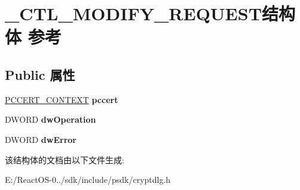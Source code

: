 \hypertarget{struct___c_t_l___m_o_d_i_f_y___r_e_q_u_e_s_t}{}\section{\+\_\+\+C\+T\+L\+\_\+\+M\+O\+D\+I\+F\+Y\+\_\+\+R\+E\+Q\+U\+E\+S\+T结构体 参考}
\label{struct___c_t_l___m_o_d_i_f_y___r_e_q_u_e_s_t}
\subsection*{Public 属性}
\begin{DoxyCompactItemize}
\item 
\mbox{\label{struct___c_t_l___m_o_d_i_f_y___r_e_q_u_e_s_t_ab5a6914e3a9c1e9f224650fc3927822c}} 
\hyperlink{struct___c_e_r_t___c_o_n_t_e_x_t}{P\+C\+C\+E\+R\+T\+\_\+\+C\+O\+N\+T\+E\+XT} {\bfseries pccert}
\item 
\mbox{\label{struct___c_t_l___m_o_d_i_f_y___r_e_q_u_e_s_t_a5ffa70f92fe0b5d5ddd06af96abb2653}} 
D\+W\+O\+RD {\bfseries dw\+Operation}
\item 
\mbox{\label{struct___c_t_l___m_o_d_i_f_y___r_e_q_u_e_s_t_a7d387951f076363d95677a62d9e0b971}} 
D\+W\+O\+RD {\bfseries dw\+Error}
\end{DoxyCompactItemize}


该结构体的文档由以下文件生成\+:\begin{DoxyCompactItemize}
\item 
E\+:/\+React\+O\+S-\/0../sdk/include/psdk/cryptdlg.\+h\end{DoxyCompactItemize}
